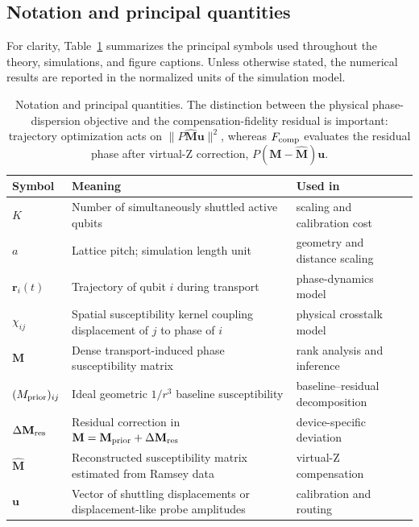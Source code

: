 \documentclass[a4paper,twocolumn,11pt]{quantumarticle}
\begin{document}
\subsection*{Notation and principal quantities}
For clarity, Table~\ref{tab:notation} summarizes the principal symbols used throughout the theory, simulations, and figure captions. Unless otherwise stated, the numerical results are reported in the normalized units of the simulation model.

\begin{table}[t!]
\centering
\caption{Notation and principal quantities. The distinction between the physical phase-dispersion objective and the compensation-fidelity residual is important: trajectory optimization acts on $\|P\hat{\mathbf M}\mathbf u\|^2$, whereas $F_{\rm comp}$ evaluates the residual phase after virtual-Z correction, $P(\mathbf M-\hat{\mathbf M})\mathbf u$.}
\label{tab:notation}
\renewcommand{\arraystretch}{1.1}
\begin{tabular}{lll}
\hline
Symbol & Meaning & Used in \\
\hline
$K$ & Number of simultaneously shuttled active qubits & scaling and calibration cost \\
$a$ & Lattice pitch; simulation length unit & geometry and distance scaling \\
$\mathbf r_i(t)$ & Trajectory of qubit $i$ during transport & phase-dynamics model \\
$\chi_{ij}$ & \makecell[l]{Spatial susceptibility kernel coupling \\ displacement of $j$ to phase of $i$} & physical crosstalk model \\
$\mathbf M$ & Dense transport-induced phase susceptibility matrix & rank analysis and inference \\
$(M_{\rm prior})_{ij}$ & Ideal geometric $1/r^3$ baseline susceptibility & baseline--residual decomposition \\
$\Delta\mathbf M_{\rm res}$ & \makecell[l]{Residual correction in \\ $\mathbf M=\mathbf M_{\rm prior}+\Delta\mathbf M_{\rm res}$} & device-specific deviation \\
$\hat{\mathbf M}$ & \makecell[l]{Reconstructed susceptibility matrix \\ estimated from Ramsey data} & virtual-Z compensation \\
$\mathbf u$ & \makecell[l]{Vector of shuttling displacements or \\ displacement-like probe amplitudes} & calibration and routing \\

\end{tabular}
\end{table}
\end{document}
